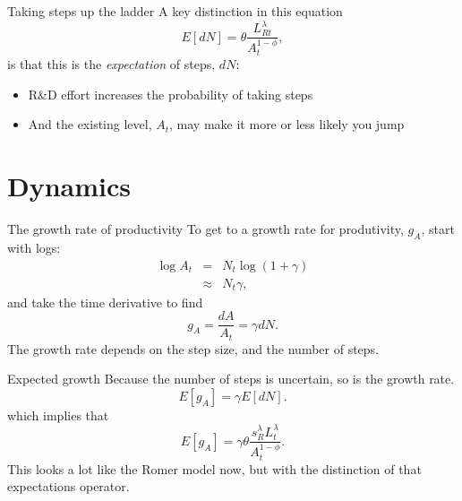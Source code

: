 \begin{frame}{Taking steps up the ladder}
A key distinction in this equation
\begin{equation}
	E[dN] = \theta \frac{L_{Rt}^{\lambda}}{A_t^{1-\phi}}, \label{EQ_dotN}
\end{equation}
is that this is the \textit{expectation} of steps, $dN$:
\begin{itemize}
	\item R\&D effort increases the probability of taking steps
	\item And the existing level, $A_t$, may make it more or less likely you jump
\end{itemize}
\end{frame}


\section{Dynamics}
\begin{frame}{The growth rate of productivity}
To get to a growth rate for produtivity, $g_A$, start with logs:
\begin{eqnarray}
	\log A_t &=& N_t \log (1+\gamma) \nonumber \\ 
	       &\approx& N_t \gamma, \nonumber
\end{eqnarray}
and take the time derivative to find
\begin{equation}
	g_A = \frac{dA}{A_t} = \gamma dN. \label{EQ_ga_dotN}
\end{equation}
The growth rate depends on the step size, and the number of steps.
\end{frame}

\begin{frame}{Expected growth}
Because the number of steps is uncertain, so is the growth rate. 
\begin{equation}
	E[g_A] = \gamma E[dN]. \label{EQ_ega_dotN}
\end{equation}
which implies that
\begin{equation}
	E[g_A] = \gamma \theta \frac{s_R^{\lambda}L_t^{\lambda}}{A_t^{1-\phi}}. \nonumber
\end{equation}
This looks a lot like the Romer model now, but with the distinction of that expectations operator. 
\end{frame}

